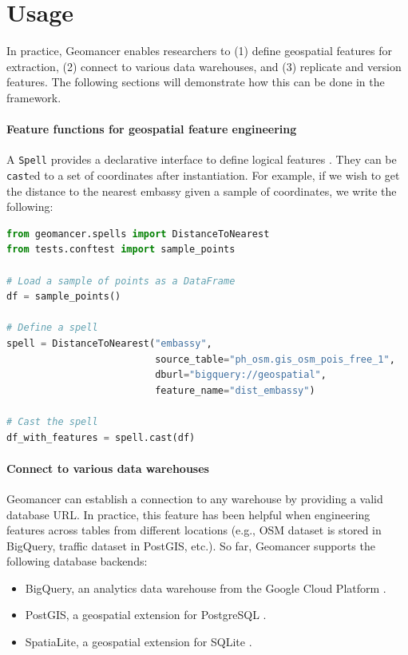 \documentclass{article}
\begin{document}
\section{Usage}

In practice, Geomancer enables researchers to (1) define geospatial features
for extraction, (2) connect to various data warehouses, and (3) replicate and
version features.  The following sections will demonstrate how this can be done
in the framework.

\paragraph{Feature functions for geospatial feature engineering}
 A \texttt{Spell} provides a declarative interface to define logical features
 \cite{smith2017ballet}. They can be \texttt{cast}ed to a set of coordinates
 after instantiation.  For example, if we wish to get the distance to the
 nearest embassy given a sample of coordinates, we write the following:

\begin{lstlisting}[language=Python]
from geomancer.spells import DistanceToNearest
from tests.conftest import sample_points

# Load a sample of points as a DataFrame
df = sample_points()

# Define a spell
spell = DistanceToNearest("embassy",
                          source_table="ph_osm.gis_osm_pois_free_1",
                          dburl="bigquery://geospatial",
                          feature_name="dist_embassy")

# Cast the spell
df_with_features = spell.cast(df)
\end{lstlisting}

\paragraph{Connect to various data warehouses}
Geomancer can establish a connection to any warehouse by providing a valid
database URL. In practice, this feature has been helpful when engineering
features across tables from different locations (e.g., OSM dataset is stored in
BigQuery, traffic dataset in PostGIS, etc.). So far, Geomancer supports the
following database backends:

\begin{itemize}
    \item BigQuery, an analytics data warehouse from the Google Cloud
        Platform \cite{google2012bigquery, melnik2010dremel}.
    \item PostGIS, a geospatial extension for PostgreSQL
        \cite{stonebraker1987postgres, stonebraker1986design}.
    \item SpatiaLite, a geospatial extension for SQLite \cite{bhosale2015sqlite,
        spatialite}.
\end{itemize}
\end{document}
